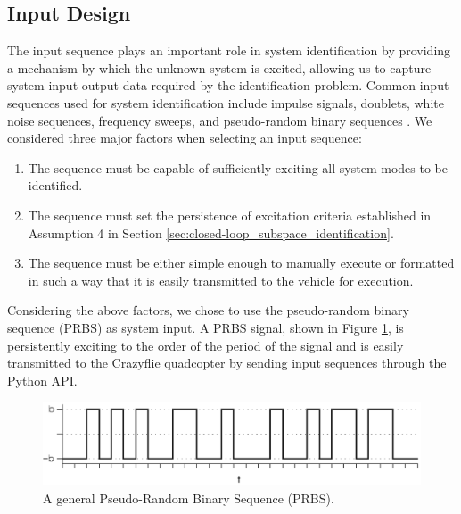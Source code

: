 \subsection{Input Design}
The input sequence plays an important role in system identification by providing a mechanism by which the unknown system is excited, allowing us to capture system input-output data required by the identification problem. Common input sequences used for system identification include impulse signals, doublets, white noise sequences, frequency sweeps, and pseudo-random binary sequences \cite{verhaegen2007filtering}. We considered three major factors when selecting an input sequence:
\begin{enumerate}
\item The sequence must be capable of sufficiently exciting all system modes to be identified.
\item The sequence must set the persistence of excitation criteria established in Assumption 4 in Section \ref{sec:closed-loop_subspace_identification}.
\item The sequence must be either simple enough to manually execute or formatted in such a way that it is easily transmitted to the vehicle for execution.  
\end{enumerate}
Considering the above factors, we chose to use the pseudo-random binary sequence (PRBS) as system input. A PRBS signal, shown in Figure \ref{fig:general_prbs}, is persistently exciting to the order of the period of the signal \cite{wilson2005understanding} and is easily transmitted to the Crazyflie quadcopter by sending input sequences through the Python API.
\begin{figure}[htb!]
	\centering
	\includegraphics{../fig/general_prbs.eps}
	\caption{A general Pseudo-Random Binary Sequence (PRBS).}
	\label{fig:general_prbs}
\end{figure}

